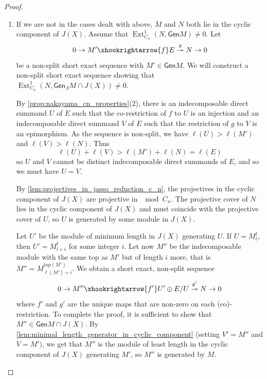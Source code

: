 \documentclass[11pt]{amsart}
\newcommand{\Gen}{\mathsf{Gen}}
\DeclareMathOperator{\Hom}{\mathrm{Hom}}
\DeclareMathOperator{\Ext}{\mathrm{Ext}}
\theoremstyle{definition}
\begin{document}
\begin{proof}
\begin{enumerate}
        Thus $\tau N$ has an inclusion into $\tau X$. But then any nonzero map  in $\Hom(M,\tau N)$ would induce a nonzero map $M \to \tau X$, which we cannot have since $M \in J(X)$. Therefore, we also have $\Hom(M,\tau N) = 0$ if $\tau N \notin J(X)$.
        
        \item If we are not in the cases dealt with above, $M$ and $N$ both lie in the cyclic component of $J(X)$. Assume that $\Ext^1_{C_n}(N,\Gen M) \neq 0$. Let \[0 \to M' \xhookrightarrow{f} E \overset{g}\twoheadrightarrow N \to 0\] be a non-split short exact sequence with $M' \in \Gen M$. We will construct a non-split short exact sequence showing that $\Ext^1_{C_n}(N,\Gen_\Lambda M \cap J(X)) \neq 0$.
        
        By \cref{prop:nakayama_cn_properties}(2), there is an indecomposable direct summand $U$ of $E$ such that the co-restriction of $f$ to $U$ is an injection and an indecomposable direct summand $V$ of $E$ such that the restriction of $g$ to $V$ is an epimorphism. As the sequence is non-split, we have $\ell(U) >\ell(M')$ and $\ell(V) > \ell(N)$. Thus \[\ell(U)+\ell(V) > \ell(M')+\ell(N) = \ell(E)\] so $U$ and $V$ cannot be distinct indecomposable direct summands of $E$, and so we must have $U = V$.

        By \cref{lem:projectives_in_jasso_reduction_c_n}, the projectives in the cyclic component of $J(X)$ are projective in $\mod C_n$. The projective cover of $N$ lies in the cyclic component of $J(X)$ and must coincide with the projective cover of $U$, so $U$ is generated by some module in $J(X)$. 
        
        Let $U'$ be the module of minimum length in $J(X)$ generating $U$. If $U = M^t_l$, then $U' = M^t_{l+i}$ for some integer $i$. Let now $M''$ be the indecomposable module with the same top as $M'$ but of length $i$ more, that is $M'' = M^{\text{top}(M')}_{\ell(M')+i}$. We obtain a short exact, non-split sequence  
        \[0 \to M'' \xhookrightarrow{f'} U' \oplus E/U \overset{g'}\twoheadrightarrow N \to 0\] where $f'$ and $g'$ are the unique maps that are non-zero on each (co)-restriction. To complete the proof, it is sufficient to show that $M'' \in \Gen M \cap J(X)$. By \cref{lem:minimal_length_generator_in_cyclic_component} (setting $V' = M''$ and $V = M')$, we get that $M''$ is the module of least length in the cyclic component of $J(X)$ generating $M'$, so $M''$ is   generated by $M$.
        \end{enumerate}
\end{proof}
    
\end{document}

